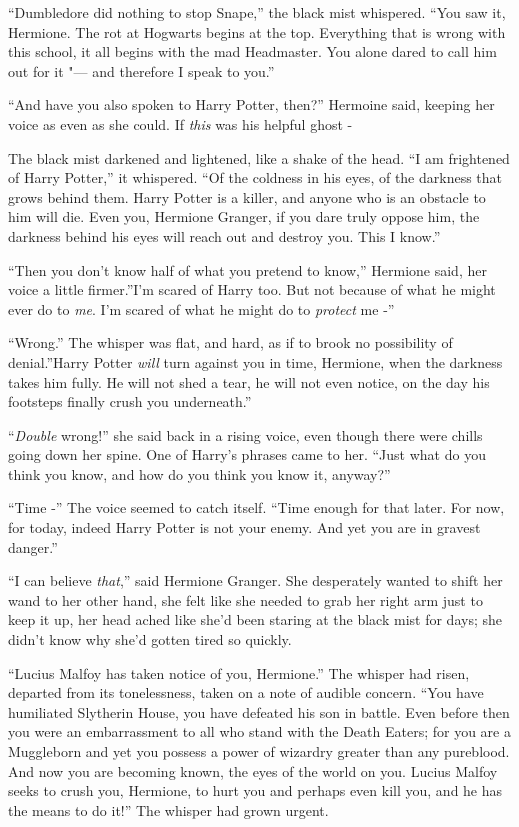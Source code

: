 ``Dumbledore did nothing to stop Snape,'' the black mist whispered.
``You saw it, Hermione. The rot at Hogwarts begins at the top.
Everything that is wrong with this school, it all begins with the mad
Headmaster. You alone dared to call him out for it "--- and therefore I
speak to you.''

``And have you also spoken to Harry Potter, then?'' Hermoine said,
keeping her voice as even as she could. If \emph{this} was his helpful
ghost -

The black mist darkened and lightened, like a shake of the head. ``I am
frightened of Harry Potter,'' it whispered. ``Of the coldness in his
eyes, of the darkness that grows behind them. Harry Potter is a killer,
and anyone who is an obstacle to him will die. Even you, Hermione
Granger, if you dare truly oppose him, the darkness behind his eyes will
reach out and destroy you. This I know.''

``Then you don't know half of what you pretend to know,'' Hermione said,
her voice a little firmer.''I'm scared of Harry too. But not because of
what he might ever do to \emph{me}. I'm scared of what he might do to
\emph{protect} me -''

``Wrong.'' The whisper was flat, and hard, as if to brook no possibility
of denial.''Harry Potter \emph{will} turn against you in time, Hermione,
when the darkness takes him fully. He will not shed a tear, he will not
even notice, on the day his footsteps finally crush you underneath.''

``\emph{Double} wrong!'' she said back in a rising voice, even though
there were chills going down her spine. One of Harry's phrases came to
her. ``Just what do you think you know, and how do you think you know
it, anyway?''

``Time -'' The voice seemed to catch itself. ``Time enough for that
later. For now, for today, indeed Harry Potter is not your enemy. And
yet you are in gravest danger.''

``I can believe \emph{that},'' said Hermione Granger. She desperately
wanted to shift her wand to her other hand, she felt like she needed to
grab her right arm just to keep it up, her head ached like she'd been
staring at the black mist for days; she didn't know why she'd gotten
tired so quickly.

``Lucius Malfoy has taken notice of you, Hermione.'' The whisper had
risen, departed from its tonelessness, taken on a note of audible
concern. ``You have humiliated Slytherin House, you have defeated his
son in battle. Even before then you were an embarrassment to all who
stand with the Death Eaters; for you are a Muggleborn and yet you
possess a power of wizardry greater than any pureblood. And now you are
becoming known, the eyes of the world on you. Lucius Malfoy seeks to
crush you, Hermione, to hurt you and perhaps even kill you, and he has
the means to do it!'' The whisper had grown urgent.

